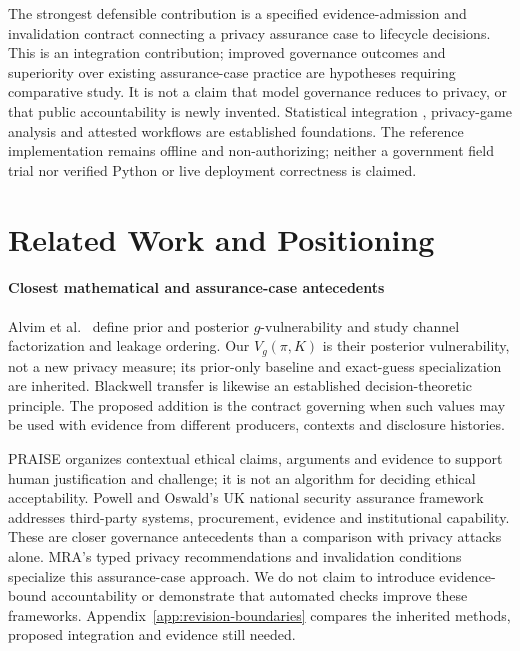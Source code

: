 \documentclass[conference,compsoc]{IEEEtran}
\begin{document}
The strongest defensible contribution is a specified evidence-admission and
invalidation contract connecting a privacy assurance case to lifecycle decisions.
This is an integration contribution; improved governance outcomes and superiority
over existing assurance-case practice are hypotheses requiring comparative study.
It is not a claim that model governance reduces to privacy, or that public
accountability is newly invented. Statistical integration
\citep{renggli2019easeml}, privacy-game analysis
\citep{salem2023privacygames,steinke2023onerun} and attested workflows
\citep{torresarias2019intoto} are established foundations. The reference
implementation remains offline and non-authorizing; neither a government
field trial nor verified Python or live deployment correctness is claimed.

\section{Related Work and Positioning}
\paragraph{Closest mathematical and assurance-case antecedents}
Alvim et al.\ \citep{alvim2012gain} define prior and posterior
$g$-vulnerability and study channel factorization and leakage ordering.
Our $V_g(\pi,K)$ is their posterior vulnerability, not a new privacy measure;
its prior-only baseline and exact-guess specialization are inherited.
Blackwell transfer is likewise an established decision-theoretic principle.
The proposed addition is the contract governing when such values may be used
with evidence from different producers, contexts and disclosure histories.

PRAISE \citep{porter2024praise} organizes contextual ethical claims, arguments
and evidence to support human justification and challenge; it is not an
algorithm for deciding ethical acceptability. Powell and Oswald's UK national
security assurance framework \citep{powell2024assurance} addresses third-party
systems, procurement, evidence and institutional capability. These are closer
governance antecedents than a comparison with privacy attacks alone.
MRA's typed privacy recommendations and invalidation conditions specialize
this assurance-case approach. We do not claim to introduce evidence-bound
accountability or demonstrate that automated checks improve these frameworks.
Appendix~\ref{app:revision-boundaries} compares the inherited methods,
proposed integration and evidence still needed.
\end{document}
